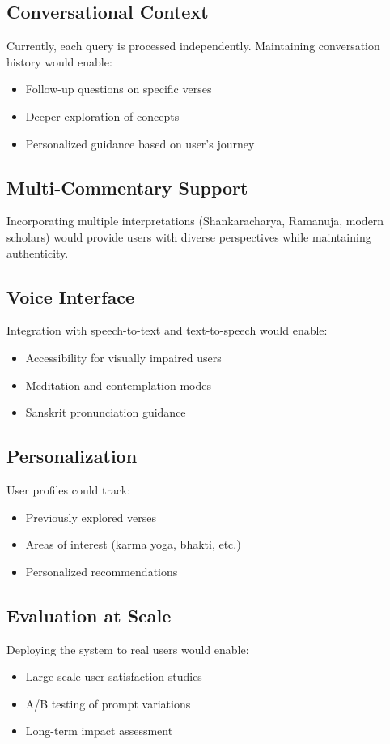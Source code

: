 \documentclass[conference]{IEEEtran}
\begin{document}
\subsection{Conversational Context}
Currently, each query is processed independently. Maintaining conversation history would enable:
\begin{itemize}
    \item Follow-up questions on specific verses
    \item Deeper exploration of concepts
    \item Personalized guidance based on user's journey
\end{itemize}

\subsection{Multi-Commentary Support}
Incorporating multiple interpretations (Shankaracharya, Ramanuja, modern scholars) would provide users with diverse perspectives while maintaining authenticity.

\subsection{Voice Interface}
Integration with speech-to-text and text-to-speech would enable:
\begin{itemize}
    \item Accessibility for visually impaired users
    \item Meditation and contemplation modes
    \item Sanskrit pronunciation guidance
\end{itemize}

\subsection{Personalization}
User profiles could track:
\begin{itemize}
    \item Previously explored verses
    \item Areas of interest (karma yoga, bhakti, etc.)
    \item Personalized recommendations
\end{itemize}

\subsection{Evaluation at Scale}
Deploying the system to real users would enable:
\begin{itemize}
    \item Large-scale user satisfaction studies
    \item A/B testing of prompt variations
    \item Long-term impact assessment
\end{itemize}
\end{document}
